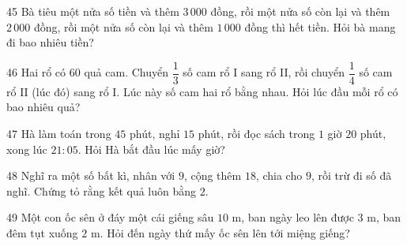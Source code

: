 \gap
\begin{probbox}{45}{}
Bà tiêu một nửa số tiền và thêm $3\,000$ đồng, rồi một nửa số còn lại và thêm $2\,000$ đồng, rồi một nửa số còn lại và thêm $1\,000$ đồng thì hết tiền. Hỏi bà mang đi bao nhiêu tiền?
\end{probbox}
\gap
\begin{probbox}{46}{}
Hai rổ có $60$ quả cam. Chuyển $\dfrac13$ số cam rổ I sang rổ II, rồi chuyển $\dfrac14$ số cam rổ II (lúc đó) sang rổ I. Lúc này số cam hai rổ bằng nhau. Hỏi lúc đầu mỗi rổ có bao nhiêu quả?
\end{probbox}
\gap
\begin{probbox}{47}{}
Hà làm toán trong $45$ phút, nghỉ $15$ phút, rồi đọc sách trong $1$ giờ $20$ phút, xong lúc $21{:}05$. Hỏi Hà bắt đầu lúc mấy giờ?
\end{probbox}
\gap
\begin{probbox}{48}{}
Nghĩ ra một số bất kì, nhân với $9$, cộng thêm $18$, chia cho $9$, rồi trừ đi số đã nghĩ. Chứng tỏ rằng kết quả luôn bằng $2$.
\end{probbox}
\gap
\begin{probbox}{49}{}
Một con ốc sên ở đáy một cái giếng sâu $10$ m, ban ngày leo lên được $3$ m, ban đêm tụt xuống $2$ m. Hỏi đến ngày thứ mấy ốc sên lên tới miệng giếng?
\end{probbox}
